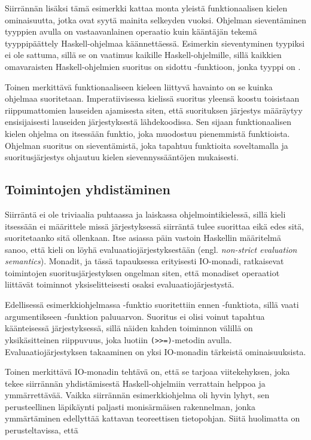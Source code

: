 \documentclass[finnish]{tktltiki2}
\begin{document}
Siirrännän lisäksi tämä esimerkki kattaa monta yleistä funktionaalisen kielen ominaisuutta, jotka
ovat syytä mainita selkeyden vuoksi. Ohjelman sieventäminen tyyppien avulla on vastaavanlainen
operaatio kuin kääntäjän tekemä tyyppipäättely Haskell-ohjelmaa käännettäessä. Esimerkin
sieventyminen tyypiksi  ei ole sattuma, sillä se on vaatimus kaikille
Haskell-ohjelmille, sillä kaikkien omavaraisten Haskell-ohjelmien suoritus on sidottu
-funktioon, jonka tyyppi on .

Toinen merkittävä funktionaaliseen kieleen liittyvä havainto on se kuinka ohjelmaa suoritetaan.
Imperatiivisessa kielissä suoritus yleensä koostu toisistaan riippumattomien lauseiden ajamisesta
siten, että suorituksen järjestys määräytyy ensisijaisesti lauseiden järjestyksestä lähdekoodissa.
Sen sijaan funktionaalisen kielen ohjelma on itsessään funktio, joka muodostuu pienemmistä
funktioista. Ohjelman suoritus on sieventämistä, joka tapahtuu funktioita soveltamalla ja
suoritusjärjestys ohjautuu kielen sievennyssääntöjen mukaisesti.

\subsection{Toimintojen yhdistäminen}

Siirräntä ei ole triviaalia puhtaassa ja laiskassa ohjelmointikielessä, sillä kieli itsessään ei
määrittele missä järjestyksessä siirräntä tulee suorittaa eikä edes sitä, suoritetaanko sitä
ollenkaan. Itse asiassa päin vastoin Haskellin määritelmä sanoo, että kieli on löyhä
evaluaatiojärjestyksestään (engl. \emph{non-strict evaluation semantics}). Monadit, ja tässä
tapauksessa erityisesti IO-monadi, ratkaisevat toimintojen suoritusjärjestyksen ongelman siten, että
monadiset operaatiot liittävät toiminnot yksiselitteisesti osaksi evaluaatiojärjestystä.

Edellisessä esimerkkiohjelmassa -funktio suoritettiin ennen -funktiota,
sillä  vaati argumentikseen -funktion paluuarvon. Suoritus ei olisi
voinut tapahtua käänteisessä järjestyksessä, sillä näiden kahden toiminnon välillä on
yksikäsitteinen riippuvuus, joka luotiin \verb|(>>=)|-metodin avulla. Evaluaatiojärjestyksen
takaaminen on yksi IO-monadin tärkeistä ominaisuuksista.

Toinen merkittävä IO-monadin tehtävä on, että se tarjoaa viitekehyksen, joka tekee siirrännän
yhdistämisestä Haskell-ohjelmiin verrattain helppoa ja ymmärrettävää. Vaikka siirrännän
esimerkkiohjelma oli hyvin lyhyt, sen perusteellinen läpikäynti paljasti monisärmäisen rakennelman,
jonka ymmärtäminen edellyttää kattavan teoreettisen tietopohjan. Siitä huolimatta on
perusteltavissa, että
\end{document}
